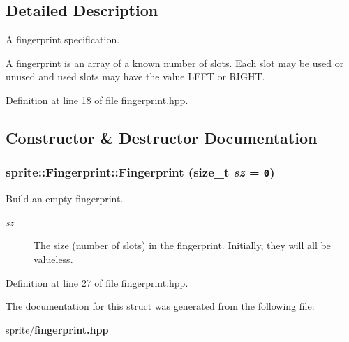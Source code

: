 \subsection{Detailed Description}
A fingerprint specification. 

A fingerprint is an array of a known number of slots. Each slot may be used or unused and used slots may have the value LEFT or RIGHT. 



Definition at line 18 of file fingerprint.hpp.

\subsection{Constructor \& Destructor Documentation}
\subsubsection{\setlength{\rightskip}{0pt plus 5cm}sprite::Fingerprint::Fingerprint (size\_\-t {\em sz} = {\tt 0})\hspace{0.3cm}{\tt  [inline]}}\label{structsprite_1_1Fingerprint_a0}


Build an empty fingerprint.

\begin{Desc}
\item[Parameters:]
\begin{description}
\item[{\em sz}]The size (number of slots) in the fingerprint. Initially, they will all be valueless. \end{description}
\end{Desc}


Definition at line 27 of file fingerprint.hpp.

The documentation for this struct was generated from the following file:\begin{CompactItemize}
\item 
sprite/{\bf fingerprint.hpp}\end{CompactItemize}
